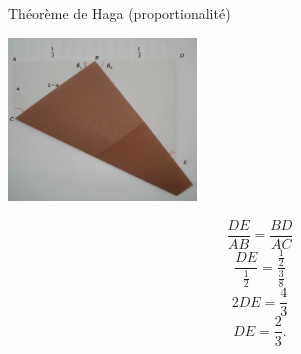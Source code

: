 \documentclass{beamer}
\begin{document}
\begin{frame}{Théorème de Haga (proportionalité)}
    \begin{multicols}{2}

    \begin{center}        
        \includegraphics[width=5cm]{haga_coupe_anote.pdf}
    \end{center}

    \begin{equation}
        \frac{ DE }{ AB }=\frac{ BD }{ AC }
    \end{equation}
    \begin{equation}
        \frac{ DE }{ \frac{ 1 }{2} }=\frac{ \frac{ 1 }{2} }{ \frac{ 3 }{ 8 } }
    \end{equation}
    \begin{equation}
        2DE=\frac{ 4 }{ 3 }
    \end{equation}
    \begin{equation}
        DE=\frac{2}{ 3 }.
    \end{equation}
    \end{multicols}

\end{frame}
\end{document}

